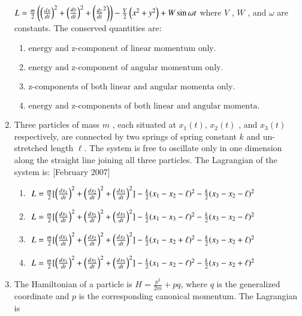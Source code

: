 \documentclass[journal]{IEEEtran}
\begin{document}
\begin{enumerate}
$L = \frac{m}{2} \left( \left( \frac{dx}{dt} \right)^2 + \left( \frac{dy}{dt} \right)^2 + \left( \frac{dz}{dt}^2 \right) \right) - \frac{V}{2} \left( x^2 + y^2 \right) + W \sin \omega t $
where  $V$ ,  $W$ , and  $\omega$  are constants. The conserved quantities are:
\begin{enumerate}
\item $\text{energy and z-component of linear momentum only.}$
\item $ \text{energy and z-component of angular momentum only.} $
\item $\text{z-components of both linear and angular momenta only.} $
\item $ \text{energy and z-components of both linear and angular momenta.}$
\end{enumerate} 
\item Three particles of mass  $m$ , each situated at $ x_1(t) $,  $x_2(t)$ , and $ x_3(t)$  respectively, are connected by two springs of spring constant  $k$ and un-stretched length $ \ell $. The system is free to oscillate only in one dimension along the straight line joining all three particles. The Lagrangian of the system is: \hfill[February 2007]
\begin{enumerate}
\item $ \ L = \frac{m}{2} [\left( \frac{dx_1}{dt} \right)^2 + \left( \frac{dx_2}{dt} \right)^2 + \left( \frac{dx_3}{dt} \right)^2] - \frac{k}{2} (x_1 - x_2 - \ell)^2 - \frac{k}{2} (x_3 - x_2 - \ell)^2$
\item $ \ L = \frac{m}{2} [\left( \frac{dx_1}{dt} \right)^2 + \left( \frac{dx_2}{dt} \right)^2 + \left(\frac{dx_3}{dt} \right)^2 ] - \frac{k}{2} (x_1 - x_3 - \ell)^2 - \frac{k}{2} (x_3 - x_2 - \ell)^2$
\item $ \ L = \frac{m}{2} [\left( \frac{dx_1}{dt} \right)^2 + \left( \frac{dx_2}{dt} \right)^2 + \left( \frac{dx_3}{dt} \right)^2] - \frac{k}{2} (x_1 - x_2 + \ell)^2 - \frac{k}{2} (x_3 - x_2 + \ell)^2$
\item $ \ L = \frac{m}{2} [\left( \frac{dx_1}{dt} \right)^2 + \left( \frac{dx_2}{dt} \right)^2 + \left( \frac{dx_3}{dt} \right)^2]  - \frac{k}{2} (x_1 - x_2 - \ell)^2 - \frac{k}{2} (x_3 - x_2 + \ell)^2$
\end{enumerate}
\item The Hamiltonian of a particle is $ H = \frac{p^2}{2m} + pq $, where  $q$ is the generalized coordinate and  $p$  is the corresponding canonical momentum. The Lagrangian is 


\end{enumerate}
\end{document}
